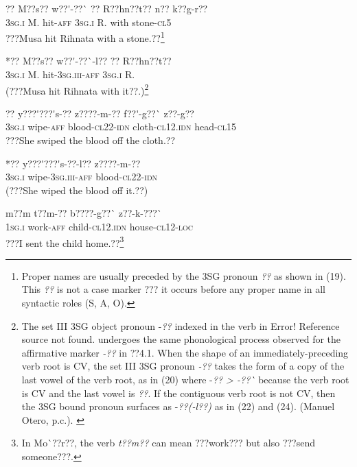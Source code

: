 \documentclass[output=paper]{langsci/langscibook}
\begin{document}
\ea \gll 
\label{bkm:Ref424201679}??    M??s??    w??\'{ }-??\`{ }    ??    R??hn??t??  n??  k??g-r??
\\
%
\textsc{3sg.i  }  M.    hit-\textsc{aff  3sg.i  }  R.    with  stone-\textsc{cl5}
\\\glt
???Musa hit Rihnata with a stone.??\footnote{ Proper names are usually preceded by the 3SG pronoun\textit{ ??} as shown in (19). This \textit{??} is not a case marker ??? it occurs before any proper name in all syntactic roles (S, A, O).}
\z


\ea \gll 
\label{bkm:Ref424201687}*??    M??s??    w??\'{ }-??\`{ }-l??    ??    R??hn??t??
\\
%
\textsc{3sg.i  }  M.    hit-\textsc{3sg.iii-aff}  \textsc{3sg.i  }  R.
\\\glt
(???Musa hit Rihnata with it??.)\footnote{ {The set III 3SG object pronoun -}{\textit{??}}{ indexed in the verb in }{Error! Reference source not found.}{ undergoes the same phonological process observed for the affirmative marker }{\textit{{}-??}}{ in ??4.1. When the shape of an immediately-preceding verb root is CV, the  set III 3SG pronoun }{\textit{{}-??}}{ takes the form of a copy of the last vowel of the verb root, as in }{(20)}{ where -}{\textit{?? {\textgreater} -??\`{ }}}{ because the verb root is CV and the last vowel is}{\textit{ ??}}{. If the contiguous verb root is not CV, then the 3SG bound pronoun surfaces as -}{\textit{??(-l??)}}{ as in }{(22)}{ and }{(24)}{. (Manuel Otero, p.c.).  }}
\z


\ea \gll 
\label{bkm:Ref424201761}??    y???\'{ }???\'{ }s-??    z????-m-??    f??\'{ }-g??\`{ }      z??-g??
\\
%
\textsc{3sg.i  }  wipe-\textsc{aff}  blood-\textsc{cl22-idn}  cloth-\textsc{cl12.idn}  head-\textsc{cl15}
\\\glt
???She swiped the blood off the cloth.??
\z


\ea \gll 
\label{bkm:Ref424201769}*??    y???\'{ }???\'{ }s-??-l??    z????-m-??
\\
%
\textsc{3sg.i  }  wipe-\textsc{3sg.iii-aff}  blood-\textsc{cl22-idn}
\\\glt
(???She wiped the blood off it.??)
\z


\ea \gll 
\label{bkm:Ref424201799}m??m    t??m-??    b????-g??\`{ }      z??-k-???\`{ }
\\
%
\textsc{1sg.i  }  work-\textsc{aff}  child-\textsc{cl12.idn}  house-\textsc{cl12-loc}
\\\glt
???I sent the child home.??\footnote{ In Mo\`{ }??r??, the verb \textit{t??m??} can mean ???work??? but also ???send someone???. }
\z
\end{document}
